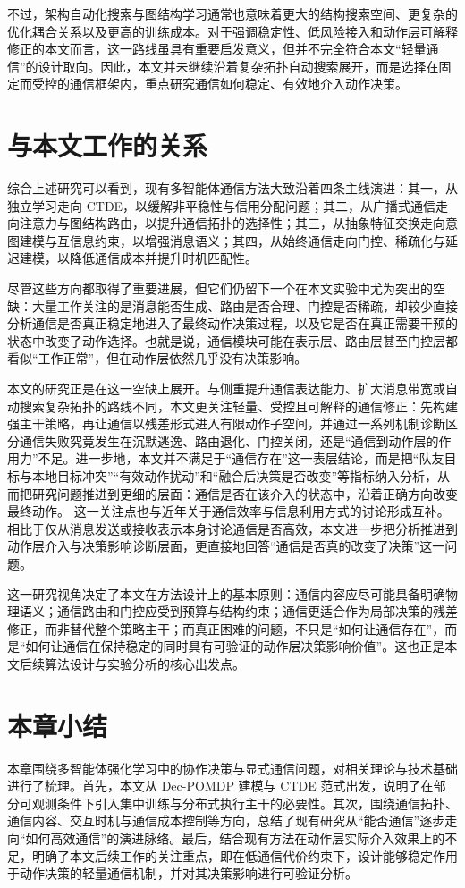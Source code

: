 不过，架构自动化搜索与图结构学习通常也意味着更大的结构搜索空间、更复杂的优化耦合关系以及更高的训练成本。对于强调稳定性、低风险接入和动作层可解释修正的本文而言，这一路线虽具有重要启发意义，但并不完全符合本文“轻量通信”的设计取向。因此，本文并未继续沿着复杂拓扑自动搜索展开，而是选择在固定而受控的通信框架内，重点研究通信如何稳定、有效地介入动作决策。

\section{与本文工作的关系}

综合上述研究可以看到，现有多智能体通信方法大致沿着四条主线演进：其一，从独立学习走向 CTDE，以缓解非平稳性与信用分配问题；其二，从广播式通信走向注意力与图结构路由，以提升通信拓扑的选择性；其三，从抽象特征交换走向意图建模与互信息约束，以增强消息语义；其四，从始终通信走向门控、稀疏化与延迟建模，以降低通信成本并提升时机匹配性。

尽管这些方向都取得了重要进展，但它们仍留下一个在本文实验中尤为突出的空缺：大量工作关注的是消息能否生成、路由是否合理、门控是否稀疏，却较少直接分析通信是否真正稳定地进入了最终动作决策过程，以及它是否在真正需要干预的状态中改变了动作选择。也就是说，通信模块可能在表示层、路由层甚至门控层都看似“工作正常”，但在动作层依然几乎没有决策影响。

本文的研究正是在这一空缺上展开。与侧重提升通信表达能力、扩大消息带宽或自动搜索复杂拓扑的路线不同，本文更关注轻量、受控且可解释的通信修正：先构建强主干策略，再让通信以残差形式进入有限动作子空间，并通过一系列机制诊断区分通信失败究竟发生在沉默逃逸、路由退化、门控关闭，还是“通信到动作层的作用力”不足。进一步地，本文并不满足于“通信存在”这一表层结论，而是把“队友目标与本地目标冲突”“有效动作扰动”和“融合后决策是否改变”等指标纳入分析，从而把研究问题推进到更细的层面：通信是否在该介入的状态中，沿着正确方向改变最终动作。
这一关注点也与近年关于通信效率与信息利用方式的讨论形成互补。相比于仅从消息发送或接收表示本身讨论通信是否高效，本文进一步把分析推进到动作层介入与决策影响诊断层面，更直接地回答“通信是否真的改变了决策”这一问题。

这一研究视角决定了本文在方法设计上的基本原则：通信内容应尽可能具备明确物理语义；通信路由和门控应受到预算与结构约束；通信更适合作为局部决策的残差修正，而非替代整个策略主干；而真正困难的问题，不只是“如何让通信存在”，而是“如何让通信在保持稳定的同时具有可验证的动作层决策影响价值”。这也正是本文后续算法设计与实验分析的核心出发点。

\section{本章小结}

本章围绕多智能体强化学习中的协作决策与显式通信问题，对相关理论与技术基础进行了梳理。首先，本文从 Dec-POMDP 建模与 CTDE 范式出发，说明了在部分可观测条件下引入集中训练与分布式执行主干的必要性。其次，围绕通信拓扑、通信内容、交互时机与通信成本控制等方向，总结了现有研究从“能否通信”逐步走向“如何高效通信”的演进脉络。最后，结合现有方法在动作层实际介入效果上的不足，明确了本文后续工作的关注重点，即在低通信代价约束下，设计能够稳定作用于动作决策的轻量通信机制，并对其决策影响进行可验证分析。
